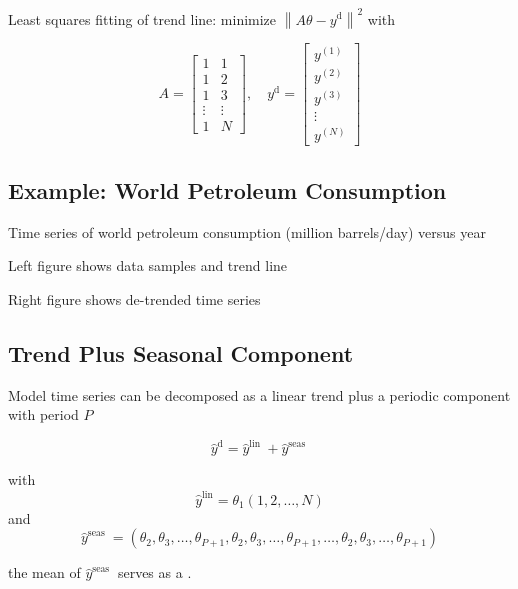 \begin{problem}
    Least squares fitting of trend line: minimize $ \left\|A \theta-y^{\mathrm{d}}\right\|^{2} $ with

$$ A=\left[\begin{array}{cc}1 & 1 \\ 1 & 2 \\ 1 & 3 \\ \vdots & \vdots \\ 1 & N\end{array}\right], \quad y^{\mathrm{d}}=\left[\begin{array}{c}y^{(1)} \\ y^{(2)} \\ y^{(3)} \\ \vdots \\ y^{(N)}\end{array}\right] $$
\end{problem}


\subsection{Example: World Petroleum Consumption}


Time series of world petroleum consumption (million barrels/day) versus year

Left figure shows data samples and trend line

Right figure shows de-trended time series


\subsection{Trend Plus Seasonal Component}

\begin{proposition}
    Model time series can be decomposed as a linear trend plus a periodic component with period $ P $

    $$
    \hat{y}^{\mathrm{d}}=\hat{y}^{\text {lin }}+\hat{y}^{\text {seas }}
    $$

    with $$ \hat{y}^{\operatorname{lin}}=\theta_{1}(1,2, \ldots, N) $$ and
$$
\hat{y}^{\text {seas }}=\left(\theta_{2}, \theta_{3}, \ldots, \theta_{P+1}, \theta_{2}, \theta_{3}, \ldots, \theta_{P+1}, \ldots, \theta_{2}, \theta_{3}, \ldots, \theta_{P+1}\right)
$$
\end{proposition}

\begin{definition}[Offset]
    the mean of $ \hat{y}^{\text {seas }} $ serves as a .
\end{definition}

